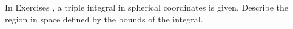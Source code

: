 {\noindent In Exercises} 
{,  a triple integral in spherical coordinates is given. Describe the region in space defined by the bounds of the integral.
}
